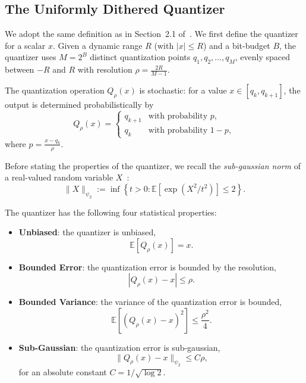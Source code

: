 \documentclass{article}
\newcommand{\Ex}[1]{\mbox{}\mathbb{E}\left[#1\right]}
\newcommand{\cbr}[1]{\left\{#1\right\}}
\newcommand{\abr}[1]{\left|#1\right|}
\newcommand{\norm}[1]{\|#1\|}
\begin{document}
\subsection{The Uniformly Dithered Quantizer}\label{app:quantizer}

We adopt the same definition as in Section~2.1 of~\citep{saha2023matrix}. We first define the quantizer for a scalar $x$. Given a dynamic range $R$ (with $|x| \le R$) and a bit-budget $B$, the quantizer uses $M = 2^B$ distinct quantization points $q_1, q_2, \dots, q_M$, evenly spaced between $-R$ and $R$ with resolution $\rho = \frac{2R}{M-1}$.

The quantization operation $Q_{\rho}(x)$ is stochastic: for a value $x \in [q_k, q_{k+1}]$, the output is determined probabilistically by
\begin{equation}
    Q_{\rho}(x) =
    \begin{cases}
        q_{k+1} & \text{with probability } p, \\
        q_k     & \text{with probability } 1-p,
    \end{cases}
\end{equation}
where $p = \frac{x-q_k}{\rho}$.

Before stating the properties of the quantizer, we recall the \emph{sub-gaussian norm} of a real-valued random variable $X$~\citep[Definition~2.6.4]{Vershynin_2026}:
\begin{equation}\label{def:subn}
    \norm{X}_{\psi_2} := \inf\cbr{t > 0 : \Ex{\exp(X^2/t^2)} \le 2}.
\end{equation}

The quantizer has the following four statistical properties:
\begin{itemize}
    \item \textbf{Unbiased}: the quantizer is unbiased,
    \begin{equation}
        \Ex{Q_{\rho}(x)} = x.
        \label{prop:quant-unbiased}
    \end{equation}
    \item \textbf{Bounded Error}: the quantization error is bounded by the resolution,
    \begin{equation}
        \abr{Q_{\rho}(x) - x} \le \rho.
        \label{prop:quant-bounded}
    \end{equation}
    \item \textbf{Bounded Variance}: the variance of the quantization error is bounded,
    \begin{equation}
        \Ex{(Q_{\rho}(x) - x)^2} \le \frac{\rho^2}{4}.
        \label{prop:quant-var}
    \end{equation}
    \item \textbf{Sub-Gaussian}: the quantization error is sub-gaussian,
    \begin{equation}
        \norm{Q_{\rho}(x) - x}_{\psi_2} \le C\rho,
        \label{prop:quant-subg}
    \end{equation}
    for an absolute constant $C = 1/\sqrt{\log 2}$.
\end{itemize}
\end{document}
